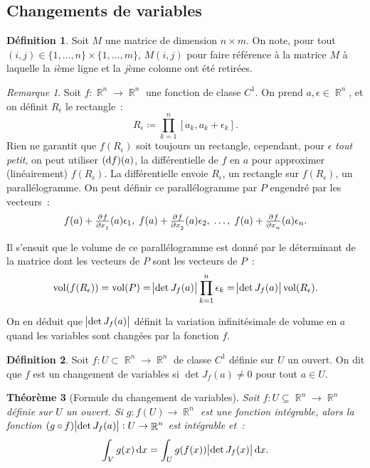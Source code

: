 \documentclass{article}
\DeclareMathOperator{\R}{\mathbb R}
\DeclareMathOperator{\vol}{vol}
\newtheorem{thm}{Théorème}[section]
\theoremstyle{definition}
\newtheorem{déf}[thm]{Définition}
\theoremstyle{remark}
\newtheorem*{rmq}{Remarque}
\begin{document}
	\subsection{Changements de variables}
		\begin{déf} Soit $M$ une matrice de dimension $n \times m$. On note, pour tout $(i, j) \in \{1, \dotsc, n\} \times \{1, \dotsc, m\}$, $M(i, j)$ pour
		faire référence à la matrice $M$ à laquelle la $i$ème ligne et la $j$ème colonne ont été retirées.
		\end{déf}

		\begin{rmq} Soit $f : \R^n \to \R^n$ une fonction de classe $C^1$. On prend $a, \epsilon \in \R^n$, et on définit $R_\epsilon$ le rectangle~:
		\[R_\epsilon \coloneqq \prod_{k=1}^n[a_k, a_k+\epsilon_k].\]
		Rien ne garantit que $f(R_\epsilon)$ soit toujours un rectangle, cependant, pour $\epsilon$ \emph{tout petit}, on peut utiliser $(\dif f)(a)$, la
		différentielle de $f$ en $a$ pour approximer (linéairement) $f(R_\epsilon)$. La différentielle envoie $R_\epsilon$, un rectangle sur $f(R_\epsilon)$,
		un parallélogramme. On peut définir ce parallélogramme par $P$ engendré par les vecteurs~:
		\[f(a) + \pd f{x_1}(a)\epsilon_1, \;f(a) + \pd f{x_2}(a)\epsilon_2, \; \dotsc, \;f(a) + \pd f{x_n}(a)\epsilon_n.\]

		Il s'ensuit que le volume de ce parallélogramme est donné par le déterminant de la matrice dont les vecteurs de $P$ sont les vecteurs de $P$~:
		\[\vol(f(R_\epsilon)) = \vol(P) = \abs{\det J_f(a)}\prod_{k=1}^n\epsilon_k = \abs{\det J_f(a)}\vol(R_\epsilon).\]

		On en déduit que $\abs{\det J_f(a)}$ définit la variation infinitésimale de volume en $a$ quand les variables sont changées par la fonction $f$.
		\end{rmq}

		\begin{déf} Soit $f : U \subset \R^n \to \R^n$ de classe $C^1$ définie sur $U$ un ouvert. On dit que $f$ est un changement de variables si
		$\det J_f(a) \neq 0$ pour tout $a \in U$.
		\end{déf}

		\begin{thm}[Formule du changement de variables] Soit $f : U \subseteq \R^n \to \R^n$ définie sur $U$ un ouvert. Si $g : f(U) \to \R^n$ est une fonction
		intégrable, alors la fonction $(g \circ f)\abs{\det J_f(a)} : U \to \R^n$ est intégrable et~:
		\[\int_V g(x)\dif x = \int_U g(f(x))\abs{\det J_f(x)}\dif x.\]
		\end{thm}
\end{document}
